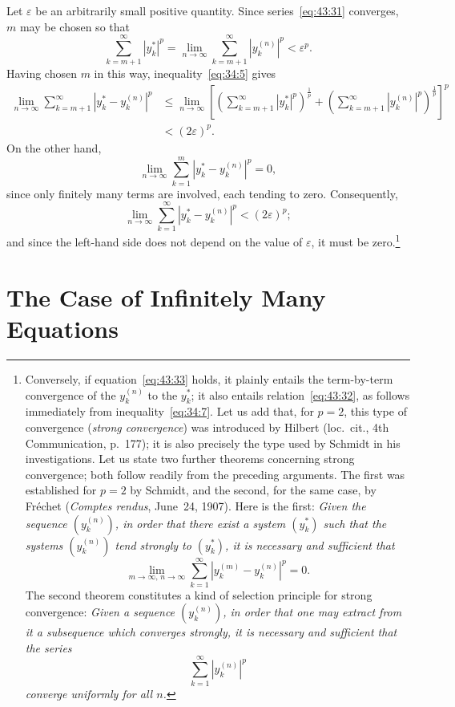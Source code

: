 \documentclass[
  paper=b5,
  fontsize=13pt,
  twoside=true,
  open=any,
  bookmarkpackage=false,
  chapterprefix=true,
  headings=normal
]{scrbook}
\theoremstyle{definition}
\begin{document}
Let $\varepsilon$ be an arbitrarily small positive quantity. Since series~\eqref{eq:43:31} converges, $m$ may be chosen so that
\[
 \sum_{k=m+1}^{\infty}|y_k^*|^p
 =\lim_{n\to\infty}\sum_{k=m+1}^{\infty}|y_k^{(n)}|^p
 <\varepsilon^p.
\]
Having chosen $m$ in this way, inequality~\eqref{eq:34:5} gives
\begin{align*}
 \lim_{n\to\infty}\sum_{k=m+1}^{\infty}|y_k^*-y_k^{(n)}|^p
 &\leq\lim_{n\to\infty}
 \left[
  \left(\sum_{k=m+1}^{\infty}|y_k^*|^p\right)^{\frac1p}
  +\left(\sum_{k=m+1}^{\infty}|y_k^{(n)}|^p\right)^{\frac1p}
 \right]^p\\
 &<(2\varepsilon)^p.
\end{align*}
On the other hand,
\[
 \lim_{n\to\infty}\sum_{k=1}^{m}|y_k^*-y_k^{(n)}|^p=0,
\]
since only finitely many terms are involved, each tending to zero. Consequently,
\[
 \lim_{n\to\infty}\sum_{k=1}^{\infty}|y_k^*-y_k^{(n)}|^p
 <(2\varepsilon)^p;
\]
and since the left-hand side does not depend on the value of $\varepsilon$, it must be zero.\footnote{Conversely, if equation~\eqref{eq:43:33} holds, it plainly entails the term-by-term convergence of the $y_k^{(n)}$ to the $y_k^*$; it also entails relation~\eqref{eq:43:32}, as follows immediately from inequality~\eqref{eq:34:7}. Let us add that, for $p=2$, this type of convergence (\emph{strong convergence}) was introduced by Hilbert (loc.~cit., 4th Communication, p.~177); it is also precisely the type used by Schmidt in his investigations. Let us state two further theorems concerning strong convergence; both follow readily from the preceding arguments. The first was established for $p=2$ by Schmidt, and the second,
for the same case, by Fr\'echet (\emph{Comptes rendus}, June~24, 1907). Here is the first: \emph{Given the sequence $(y_k^{(n)})$, in order that there exist a system $(y_k^*)$ such that the systems $(y_k^{(n)})$ tend strongly to $(y_k^*)$, it is necessary and sufficient that
\[
 \lim_{m\to\infty,\,n\to\infty}
 \sum_{k=1}^{\infty}|y_k^{(m)}-y_k^{(n)}|^p=0.
\]}
The second theorem constitutes a kind of selection principle for strong convergence: \emph{Given a sequence $(y_k^{(n)})$, in order that one may extract from it a subsequence which converges strongly, it is necessary and sufficient that the series
\[
 \sum_{k=1}^{\infty}|y_k^{(n)}|^p
\]
converge uniformly for all $n$.}}

\section{The Case of Infinitely Many Equations}
\end{document}
